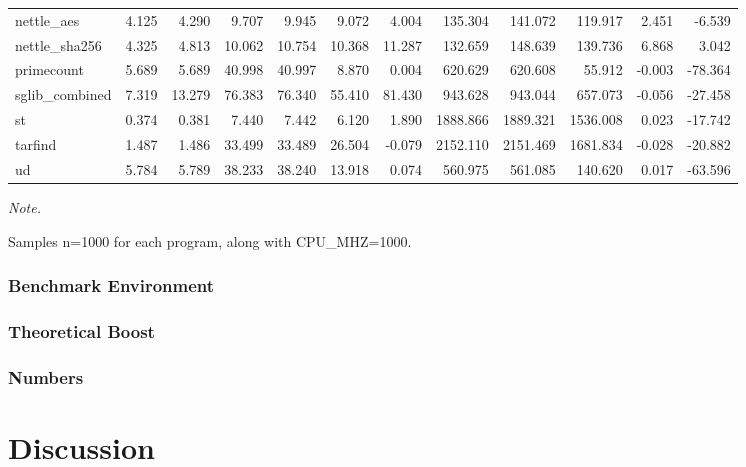 \documentclass[a4paper, nobind]{templates/ociamthesis}
\begin{document}
\begin{landscape}
\begin{table}
{\begin{threeparttable}
\begin{tabular}[t]{llrrrrrrrrrr}
nettle\_aes & 4.125 & 4.290 & 9.707 & 9.945 & 9.072 & 4.004 & 135.304 & 141.072 & 119.917 & 2.451 & -6.539\\
nettle\_sha256 & 4.325 & 4.813 & 10.062 & 10.754 & 10.368 & 11.287 & 132.659 & 148.639 & 139.736 & 6.868 & 3.042\\
\addlinespace
primecount & 5.689 & 5.689 & 40.998 & 40.997 & 8.870 & 0.004 & 620.629 & 620.608 & 55.912 & -0.003 & -78.364\\
sglib\_combined & 7.319 & 13.279 & 76.383 & 76.340 & 55.410 & 81.430 & 943.628 & 943.044 & 657.073 & -0.056 & -27.458\\
st & 0.374 & 0.381 & 7.440 & 7.442 & 6.120 & 1.890 & 1888.866 & 1889.321 & 1536.008 & 0.023 & -17.742\\
tarfind & 1.487 & 1.486 & 33.499 & 33.489 & 26.504 & -0.079 & 2152.110 & 2151.469 & 1681.834 & -0.028 & -20.882\\
ud & 5.784 & 5.789 & 38.233 & 38.240 & 13.918 & 0.074 & 560.975 & 561.085 & 140.620 & 0.017 & -63.596\\
\bottomrule
\end{tabular}
\begin{tablenotes}[para]
\item \textit{Note.} 
\item Samples n=1000 for each program, along with CPU\_MHZ=1000.
\end{tablenotes}
\end{threeparttable}}
\end{table}
\end{landscape}

\subsection{Benchmark Environment}\label{benchmark-environment}

\subsection{Theoretical Boost}\label{theoretical-boost}

\subsection{Numbers}\label{numbers}

\chapter{Discussion}\label{discussion}
\end{document}
